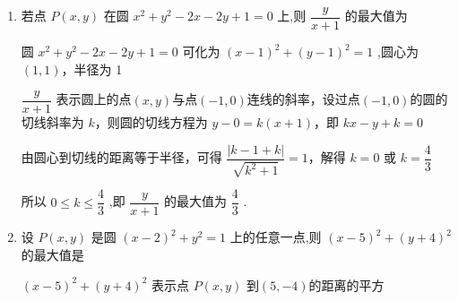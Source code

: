 \begin{enumerate}
\begin{enumerate}
\begin{jieda}
\begin{enumerate}
                故${\left( \dfrac{y}{x}\right) }_{\max } = \sqrt{3},{\left( \dfrac{y}{x}\right) }_{\min } =  - \sqrt{3}$ .
                \item 设 $y - x = b$ ,则 $y = x + b$ ,当且仅当直线 $y = x + b$ 与圆相切于第四象限时,截距 $b$ 取最小值,由点到直线的距离公式,得 $\dfrac{\left| 2 + b\right| }{\sqrt{2}} = \sqrt{3}$ ,即 $b =  - 2 \pm  \sqrt{6}$ , 故 ${\left( y - x\right) }_{\min } =  - 2 - \sqrt{6}$ .
                \item ${x}^{2} + {y}^{2}$ 是圆上点与原点的距离的平方,设圆与 $x$ 轴相交于点 $B$ 和 ${C}^{\prime }$ (点 $B$ 在点 ${C}^{\prime }$ 左侧),则 ${\left( {x}^{2} + {y}^{2}\right) }_{\max } = {\left| O{C}^{\prime }\right| }^{2}$  $= {\left( 2 + \sqrt{3}\right) }^{2} = 7 + 4\sqrt{3},{\left( {x}^{2} + {y}^{2}\right) }_{\min } = {\left| OB\right| }^{2} = {\left( 2 - \sqrt{3}\right) }^{2} = 7 - 4\sqrt{3}$ .
            \end{enumerate}
        \end{jieda}
        \item 若点 $P\left( {x,y}\right)$ 在圆 ${x}^{2} + {y}^{2} - {2x} - {2y} + 1 = 0$ 上,则 $\dfrac{y}{x + 1}$ 的最大值为
        \begin{jieda}
            圆 ${x}^{2} + {y}^{2} - {2x} - {2y} + 1 = 0$ 可化为 ${\left( x - 1\right) }^{2} + {\left( y - 1\right) }^{2} = 1$ ,圆心为$(1,1)$，半径为 1

            $\dfrac{y}{x + 1}$ 表示圆上的点$(x, y)$与点$(-1,0)$连线的斜率，设过点$(-1,0)$的圆的切线斜率为 $k$，则圆的切线方程为 $y - 0 = k\left( {x + 1}\right)$，即 ${kx} - y + k = 0$
            
            由圆心到切线的距离等于半径，可得 $\dfrac{\left| k - 1 + k\right| }{\sqrt{{k}^{2} + 1}} = 1$，解得 $k = 0$ 或 $k = \dfrac{4}{3}$
            
            所以 $0 \leq  k \leq  \dfrac{4}{3}$ ,即 $\dfrac{y}{x + 1}$ 的最大值为 $\dfrac{4}{3}$ .
        \end{jieda}
        \item 设 $P\left( {x,y}\right)$ 是圆 ${\left( x - 2\right) }^{2} + {y}^{2} = 1$ 上的任意一点,则 ${\left( x - 5\right) }^{2} + {\left( y + 4\right) }^{2}$ 的最大值是
        \begin{jieda}
            ${\left( x - 5\right) }^{2} + {\left( y + 4\right) }^{2}$ 表示点 $P\left( {x,y}\right)$ 到$(5, -4)$的距离的平方
            

\end{jieda}
\end{enumerate}
\end{enumerate}
